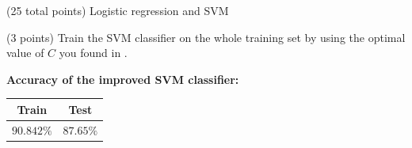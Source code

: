\documentclass[12pt]{article}
\begin{document}
\begin{question}{(25 total points) Logistic regression and SVM}
\begin{subquestion}
   \end{subquestion}
   \begin{subquestion}{(3 points)
       Train the SVM classifier on the whole training set by using the
       optimal value of $C$ you found in . 
     } \label{Q2.6}


       

      \begin{answerbox}{10em}
        \textbf{Accuracy of the improved SVM classifier:}
        \medskip
        \begin{center}
            \begin{tabular}{c|c}
            \toprule
              Train & Test \\ \hline
              $90.842\%$ & $87.65\%$ \\
            \bottomrule
         \end{tabular}
        \end{center}
      \end{answerbox}
  


   \end{subquestion}
%
%

\end{question}
\clearpage
%
%
\end{document}
